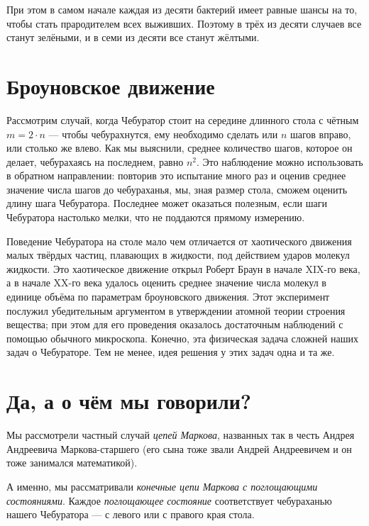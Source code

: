 \documentclass{article}
\begin{document}
При этом в самом начале каждая из десяти бактерий 
имеет равные шансы на то, чтобы стать прародителем всех выживших.
Поэтому в трёх из десяти случаев все станут зелёными, 
и в семи из десяти все станут жёлтыми.


\section{Броуновское движение}

Рассмотрим случай, когда Чебуратор стоит на середине длинного стола с чётным $m=2\cdot n$ ---
чтобы чебурахнутся, ему необходимо сделать или $n$ шагов вправо, или столько же влево.
Как мы выяснили, среднее количество шагов, которое он делает, чебурахаясь на последнем, равно $n^2$. 
Это наблюдение можно использовать в обратном направлении:
повторив это испытание много раз и оценив среднее значение числа шагов до чебураханья, мы, 
зная размер стола, сможем оценить длину шага Чебуратора.
Последнее может оказаться полезным, если шаги Чебуратора настолько мелки, что не поддаются прямому измерению. 

Поведение Чебуратора на столе мало чем отличается 
от хаотического движения малых твёрдых частиц, плавающих в жидкости, под действием ударов молекул жидкости. 
Это хаотическое движение открыл Роберт Браун в начале XIX-го века, а в начале XX-го века удалось оценить
среднее значение числа молекул в единице объёма по параметрам броуновского движения.
Этот эксперимент послужил убедительным аргументом в утверждении атомной теории строения вещества; при этом для его проведения оказалось достаточным
наблюдений с помощью обычного микроскопа.
Конечно, эта физическая задача сложней наших задач о Чебураторе.
Тем не менее, идея решения у этих задач одна и та же.



\section{Да, а о чём мы говорили?}

Мы рассмотрели частный случай \emph{цепей Маркова},
названных так в честь Андрея Андреевича Маркова-старшего (его сына тоже звали Андрей Андреевичем и он тоже занимался математикой).

А именно, мы рассматривали \emph{конечные цепи Маркова с поглощающими состояниями}.
Каждое \emph{поглощающее состояние} соответствует чебураханью нашего Чебуратора --- с левого или с правого края стола.
\end{document}
